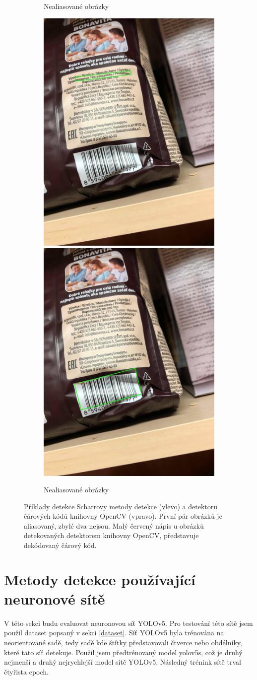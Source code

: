 \begin{figure}[h]
\begin{subfigure}{0.9\textwidth}
    \caption{Nealiasované obrázky}
    \end{subfigure}
    \begin{subfigure}{0.9\textwidth}
    \includegraphics[width=0.4\linewidth]{obrazky-figures/scharr_test4.jpg}\hfill
    \includegraphics[width=0.4\linewidth]{obrazky-figures/opencv_test4.jpg}\hfill
    \caption{Nealiasované obrázky}
    \end{subfigure}
    \caption{Příklady detekce Scharrovy metody detekce (vlevo) a detektoru čárových kódů knihovny OpenCV (vpravo). První pár obrázků je aliasovaný, zbylé dva nejsou. Malý červený nápis u obrázků detekovaných detektorem knihovny OpenCV, představuje dekódovaný čárový kód.}
    \label{iou}
\end{figure}

\clearpage
\section{Metody detekce používající neuronové sítě}
\paragraph{} V této sekci budu evaluovat neuronovou síť YOLOv5. Pro testování této sítě jsem použil dataset popsaný v sekci \ref{dataset}. Síť YOLOv5 byla trénována na neorientované sadě, tedy sadě kde štítky představovali čtverce nebo obdélníky, které tato síť detekuje. Použil jsem předtrénovaný model yolov5s, což je druhý nejmenší a druhý nejrychlejší model sítě YOLOv5. Následný trénink sítě trval čtyřista epoch.
